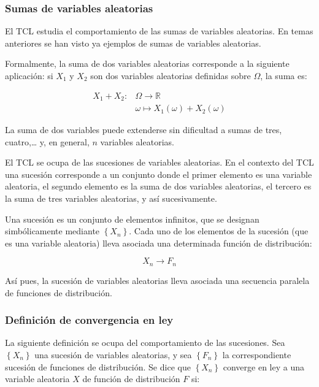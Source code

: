 \documentclass[
]{article}
\begin{document}
\subsubsection{Sumas de variables aleatorias}\label{sumas-de-variables-aleatorias}

El TCL estudia el comportamiento de las sumas de variables aleatorias. En temas anteriores se han visto ya ejemplos de sumas de variables aleatorias.

Formalmente, la suma de dos variables aleatorias corresponde a la siguiente aplicación: si \(X_{1}\) y \(X_{2}\) son dos variables aleatorias definidas sobre \(\Omega\), la suma es:

\[
\begin{aligned}
X_{1}+X_{2}: & \Omega \rightarrow \mathbb{R} \\
& \omega \mapsto X_{1}(\omega)+X_{2}(\omega)
\end{aligned}
\]

La suma de dos variables puede extenderse sin dificultad a sumas de tres, cuatro,\ldots{} y, en general, \(n\) variables aleatorias.

El TCL se ocupa de las sucesiones de variables aleatorias. En el contexto del TCL una sucesión corresponde a un conjunto donde el primer elemento es una variable aleatoria, el segundo elemento es la suma de dos variables aleatorias, el tercero es la suma de tres variables aleatorias, y así sucesivamente.

Una sucesión es un conjunto de elementos infinitos, que se designan simbólicamente mediante \(\left\{X_{n}\right\}\).
Cada uno de los elementos de la sucesión (que es una variable aleatoria) lleva asociada una determinada función de distribución:

\[
X_{n} \rightarrow F_{n}
\]

Así pues, la sucesión de variables aleatorias lleva asociada una secuencia paralela de funciones de distribución.

\subsubsection{Definición de convergencia en ley}\label{definiciuxf3n-de-convergencia-en-ley}

La siguiente definición se ocupa del comportamiento de las sucesiones.
Sea \(\left\{X_{n}\right\}\) una sucesión de variables aleatorias, y sea \(\left\{F_{n}\right\}\) la correspondiente sucesión de funciones de distribución. Se dice que \(\left\{X_{n}\right\}\) converge en ley a una variable aleatoria \(X\) de función de distribución \(F\) si:
\end{document}
